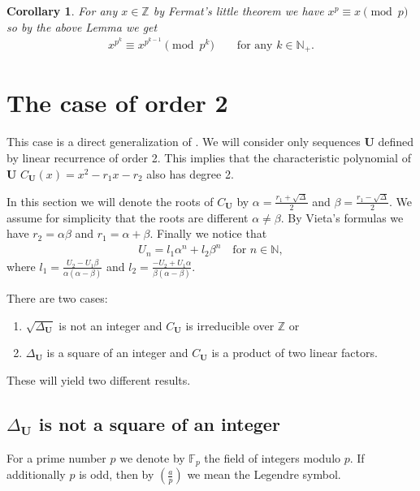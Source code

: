 \documentclass[preprint,12pt]{elsarticle}
\newcommand{\N}{\mathbb{N}}
\newcommand{\Z}{\mathbb{Z}}
\newcommand{\F}{\mathbb{F}}
\newcommand{\Li}[2]{\left(\frac{#1}{#2}\right)}
\newtheorem{corollary}{Corollary}[theorem]
\begin{document}
\begin{corollary} \label{c_fermat}
    For any $x\in\Z$ by Fermat's little theorem we have $x^p\equiv x\pmod{p}$ so by the above Lemma we get 
    \begin{align}
            x^{p^{k}} \equiv x^{p^{k-1}}\pmod{p^k}
            \quad\quad\text{for any $k\in\N_+$}.
    \end{align}
\end{corollary}






\section{The case of order 2}


This case is a direct generalization of \cite{Fibonacci}.  We will consider only sequences $\mathbf U$ defined by linear recurrence of order 2. This implies that the characteristic polynomial of $ \mathbf U$ $C_{\mathbf U}(x) = x^2-r_1x-r_2$ also has degree 2. 

In this section we will denote the roots of $C_\mathbf{U}$ by $\alpha=\frac{r_1+\sqrt{\Delta}}{2}$ and $\beta=\frac{r_1-\sqrt\Delta}{2}$. We assume for simplicity that the roots are different $\alpha \not= \beta$. By Vieta's formulas we have $r_2 = \alpha\beta$ and $r_1 = \alpha+\beta$. Finally we notice that
\begin{align}
    U_n = l_1\alpha^n + l_2\beta^n \quad \text{for $n\in\N$}, 
\end{align}
where $l_1 = \frac{U_2 -  U_1\beta}{\alpha(\alpha-\beta)}$ and $l_2 = \frac{- U_2 +  U_1\alpha}{\beta(\alpha-\beta)}$. 



\vskip 0.3cm
There are two cases:
\begin{enumerate}
    \item $\sqrt{\Delta_{\mathbf U}}$ is not an integer and $C_{\mathbf U}$ is irreducible over $\Z$ or
    \item $\Delta_{\mathbf U}$ is a square of an integer and $C_{\mathbf U}$ is a product of two linear factors.
\end{enumerate}
These will yield two different results. 




\subsection{$\Delta_{\mathbf U}$ is not a square of an integer}
For a prime number $p$ we denote by $\F_{p}$ the field of integers modulo $p$. If additionally $p$ is odd, then by $\Li{a}{p}$ we mean the Legendre symbol.
\end{document}
